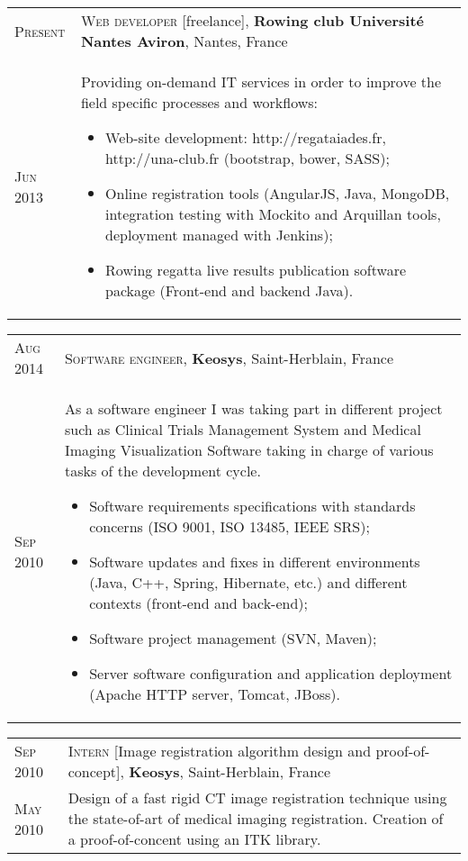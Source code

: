 \documentclass[letter,10pt]{article} %
\begin{document}
\begin{tabular}{R{2cm}|p{15.5cm}}

\textsc{Present} & \textsc{Web developer} [freelance], \normalsize\textbf{Rowing
club Universit\'{e} Nantes Aviron}, Nantes, France \\
\textsc{Jun 2013} & \vspace{-1mm}  Providing on-demand IT services in order to
improve the field specific processes and workflows:
\begin{itemize} 
\item Web-site development: http://regataiades.fr, http://una-club.fr
(bootstrap, bower, SASS);
\item Online registration tools (AngularJS, Java, MongoDB, integration testing
with Mockito and Arquillan tools, deployment managed with Jenkins);
\item Rowing regatta live results publication software package (Front-end and
backend Java).
\end{itemize}
 
\end{tabular}

\begin{tabular}{R{2cm}|p{15.5cm}}
\textsc{Aug 2014} & \textsc{Software engineer}, \normalsize\textbf{Keosys},
Saint-Herblain, France
\\
\textsc{Sep 2010} & \vspace{-1mm} As a software engineer I was taking part in
different project such as Clinical Trials Management System and Medical Imaging
Visualization Software taking in charge of various tasks of the
development cycle.
\begin{itemize} 
\item Software requirements specifications with standards concerns (ISO 9001,
ISO 13485, IEEE SRS);
\item Software updates and fixes in different environments (Java, C++, Spring,
Hibernate, etc.) and different contexts (front-end and back-end);
\item Software project management (SVN, Maven);
\item Server software configuration and application deployment 
(Apache HTTP server, Tomcat, JBoss).
\end{itemize} 

\end{tabular}


\begin{tabular}{R{2cm}|p{15.5cm}}

\textsc{Sep 2010} & \textsc{Intern} [Image registration algorithm design and
proof-of-concept], \normalsize\textbf{Keosys},
Saint-Herblain, France \\
\textsc{May 2010} & \vspace{-1mm} Design of a fast rigid CT image registration technique using the
state-of-art of medical imaging registration. Creation of a proof-of-concent
using an ITK library.

\end{tabular}
\end{document}
